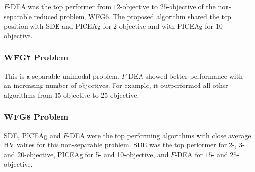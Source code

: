 \documentclass[review]{elsarticle}
\begin{document}
$F$-DEA was the top performer from $12$-objective  to $25$-objective of the non-separable reduced problem, WFG6. 
The proposed algorithm shared the top position with SDE and PICEAg for $2$-objective  and with PICEAg for 10-objective.

%

\subsubsection{WFG7 Problem}
%

This is a separable unimodal problem. $F$-DEA showed better performance with an increasing number of objectives.
For example, it outperformed all other algorithms from 
15-objective to 25-objective.

\subsubsection{WFG8 Problem}

SDE, PICEAg and $F$-DEA were the top performing algorithms with close average HV values for this 
non-separable problem.
SDE was the top performer for 2-, 3- and 20-objective, PICEAg for 5- and 10-objective,
and $F$-DEA for $15$- and $25$-objective. 
\end{document}
